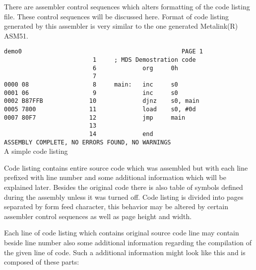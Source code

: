     There are assembler control sequences which alters formatting of the code listing file. These control sequences will be discussed here. Format of code listing generated by this assembler is very similar to the one generated Metalink(R) ASM51.

    \begin{code}[h]
        \mysmallfont{}
        \verb'demo0                                             PAGE 1'\\
        \verb'                         1     ; MDS Demostration code'\\
        \verb'                         6             org     0h'\\
        \verb'                         7'\\
        \verb'0000 08                  8     main:   inc     s0'\\
        \verb'0001 06                  9             inc     s0'\\
        \verb'0002 B87FFB             10             djnz    s0, main'\\
        \verb'0005 7800               11             load    s0, #0d'\\
        \verb'0007 80F7               12             jmp     main'\\
        \verb'                        13'\\
        \verb'                        14             end'\\
        \verb'ASSEMBLY COMPLETE, NO ERRORS FOUND, NO WARNINGS'\\
        \caption{A simple code listing}
    \end{code}

    Code listing contains entire source code which was assembled but with each line prefixed with line number and some additional information which will be explained later. Besides the original code there is also table of symbols defined during the assembly unless it was turned off. Code listing is divided into pages separated by form feed character, this behavior may be altered by certain assembler control sequences as well as page height and width.

    Each line of code listing which contains original source code line may contain beside line number also some additional information regarding the compilation of the given line of code. Such a additional information might look like this and is composed of these parts:

